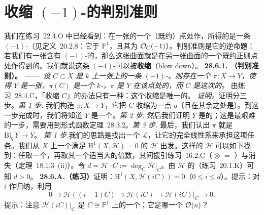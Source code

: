 
\section{收缩 $(-1)$-\trCurve{}的\trCastelnuovo{}判别准则}

我们在\mbox{练习~22.4.O} 中已经看到：在一张\trRegular\trSurface{}的一个（既约）点处作\trBlowup，所得的\trExceptionalDivisor{}是一条 $(-1)$-\trCurve{}（见\mbox{定义~20.2.8}：它\trIsomorphic{}于 $\mathbb{P}^1$，且其\trNormalBundle{}为 $\mathcal{O}_C(-1)$）。\trCastelnuovo{}判别准则是它的逆命题：若我们有一张含有 $(-1)$-\trCurve{}的\trQuasiprojective{}\trSurface，那么这张曲面就是在另一张曲面的一个既约正则点处作\trBlowup{}得到的。我们就说这条 $(-1)$-\trCurve{}可以被\textbf{收缩}（blow down）。
\textbf{28.6.1. \trhTheorem（\trCastelnuovo{}判别准则）。}\ ——\ \emph{设 $C\subset X$ 是 $k$ 上一张\trSmooth\trProjective{}\trSurface{}上的一条 $(-1)$-\trCurve。则存在一个\trBirational\trMorphism{} $\pi\colon X\to Y$，使得 $Y$ 是一张\trSmooth\trProjective{}\trSurface，$\pi(C)$ 是一个 $k$-\trValuedPoint，$\pi$ 是 $Y$ 在该点处的\trBlowup，而 $C$ 是这次\trBlowup{}的\trExceptionalDivisor。}
由\mbox{练习~28.4.C}，「收缩 $C$」的办法只有一种：这个收缩是唯一的。
\emph{证明。}\quad 证明分三步。\emph{第 1 步.} 我们构造 $\pi\colon X\to Y$，它把 $C$ 收缩为一点 $q$（且在其余之处是\trIsomorphism）。到这一步完成时，我们将知道 $Y$ 是一个\trProjective\trVariety。\emph{第 2 步.} 然后我们证明 $Y$ 是\trSmooth{}的；这是最艰难的一步，需要用到\mbox{形式函数定理~28.3.2}。\emph{第 3 步.} 最后，我们认出 $\pi$ 就是\trBlowup{} $\mathrm{Bl}_q\,Y\to Y$。
\emph{第 1 步.}\quad 我们的思路是找出一个\trInvertibleSheaf{} $\mathscr{L}$，让它的完全线性系来承担这项任务。我们从 $X$ 上一个满足 $\mathrm{H}^1(X,\mathscr{H})=0$ 的\trVeryAmple\trInvertibleSheaf{} $\mathscr{H}$ 出发。这样的\trInvertibleSheaf{} $\mathscr{H}$ 可以如下找到：任取一个\trVeryAmple\trInvertibleSheaf，再取其一个适当大的倍数，其间援引\mbox{练习~16.2.C}（\trVeryAmple{} $\otimes$ \trVeryAmple{} $=$ \trVeryAmple{}）与\trSerre{}消失（\mbox{定理~18.1.3}~(ii)）。令 $d=\mathscr{H}\cdot C:=\deg_C\mathscr{H}|_C$。由 $\mathscr{H}$ 的\trVeryAmpleness{}（\mbox{练习~20.1.K}）可知 $d>0$。
\textbf{28.6.A.（练习）}\quad 证明：$\mathrm{H}^1(X,\mathscr{H}(iC))=0$（$0\le i\le d$）。提示：对 $i$ 作归纳，利用
\begin{equation*}
\tag{28.6.1.1}\label{eq:castelnuovo-restriction-seq}
0\longrightarrow\mathscr{H}((i-1)C)\longrightarrow\mathscr{H}(iC)\longrightarrow\mathscr{H}(iC)|_C\longrightarrow 0.
\end{equation*}
提示：注意 $\mathscr{H}(iC)|_C$ 是 $C\cong\mathbb{P}^1$ 上的一个\trLineBundle；它是哪一个 $\mathcal{O}(n)$？
